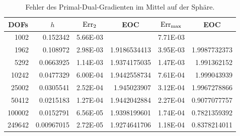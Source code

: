 \begin{beispiel}[Sphäre]
      \begin{table}[htbp]
       \centering
       \begin{tabular}{|r|r|r|r|r|r|}
       \hline
       \multicolumn{1}{|c|}{DOFs} & \multicolumn{1}{c|}{\( h \)} & \multicolumn{1}{c|}{\( \text{Err}_{2} \)} & \multicolumn{1}{c|}{EOC} &
       \multicolumn{1}{c|}{ \( \text{Err}_{\max} \)} & \multicolumn{1}{c|}{EOC} \\ \hline
       1002 & 0.152342 & 5.66E-03 & \multicolumn{1}{l|}{} & 7.71E-03 & \multicolumn{1}{l|}{} \\ \hline
        1962 & 0.108972 & 2.98E-03 & 1.9186534413 & 3.95E-03 & 1.9987732373 \\ \hline
        5292 & 0.0663925 & 1.14E-03 & 1.9374175035 & 1.47E-03 & 1.991362152 \\ \hline
        10242 & 0.0477329 & 6.00E-04 & 1.9442558734 & 7.61E-04 & 1.999043939 \\ \hline
        25002 & 0.0305541 & 2.52E-04 & 1.945023907 & 3.12E-04 & 1.9967278866 \\ \hline
        50412 & 0.0215183 & 1.27E-04 & 1.9442042884 & 2.27E-04 & 0.9077077757 \\ \hline
        100002 & 0.0152791 & 6.56E-05 & 1.9398199601 & 1.74E-04 & 0.7821359392 \\ \hline
        249642 & 0.00967015 & 2.72E-05 & 1.9274641706 & 1.18E-04 & 0.8378214011 \\ \hline
       \end{tabular}
       \caption[Gradient auf Sphäre]{Fehler des Primal-Dual-Gradienten im Mittel auf der Sphäre.}
       \label{tabGradSphere}
      \end{table}
    \end{beispiel}

